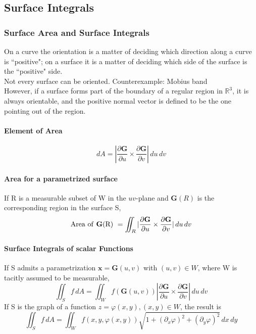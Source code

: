 \documentclass[11pt]{article}
\newcommand{\tb}[1]{\textbf{#1}}
\newcommand{\real}[0]{\mathbb{R}}
\newcommand{\vx}[0]{\tb{x}}
\begin{document}
\subsection{Surface Integrals}
\subsubsection{Surface Area and Surface Integrals}
On a curve the orientation is a matter of deciding which direction along a curve is ``positive"; on a surface it is a matter of deciding which side of the surface is the ``positive" side. \\
Not every surface can be oriented. Counterexample: Mobius band \\
However, if a surface forms part of the boundary of a regular region in $\real^3$, it is always orientable, and the positive normal vector is defined to be the one pointing out of the region.
\paragraph{Element of Area}
$$dA = |\frac{\partial \tb{G}}{\partial u} \times \frac{\partial \tb{G}}{\partial v}| \, du\, dv$$
\paragraph{Area for a parametrized surface}
If R is a measurable subset of W in the $uv$-plane and $\tb{G}(R)$ is the corresponding region in the surface S,
$$\mbox{Area of \tb{G}(R) } = \iint_R|\frac{\partial \tb{G}}{\partial u} \times \frac{\partial \tb{G}}{\partial v}| \, du\, dv$$
\paragraph{Surface Integrals of scalar Functions}
If S admits a parametrization $\vx = \tb{G}(u,v)$ with $(u,v)\in W$, where W is tacitly assumed to be measurable,
$$\iint_S f \, dA = \iint_W f(\tb{G}(u,v))|\frac{\partial \tb{G}}{\partial u}\times \frac{\partial \tb{G}}{\partial v}| \, du\, dv$$
If S is the graph of a function $z = \varphi(x, y), (x,y) \in W$, the result is
$$\iint_S f\, dA = \iint_W f(x,y,\varphi(x,y))\sqrt{1+(\partial_x \varphi)^2 + (\partial_y \varphi)^2}\, dx \, dy$$
\end{document}

